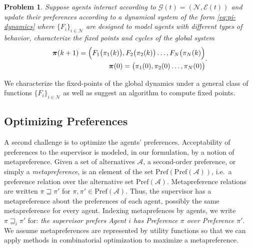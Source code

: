 \documentclass[conference]{ieeeconf}
\newcommand{\N}{\mathcal{N}}
\newcommand{\A}{\mathcal{A}}
\newcommand{\Pref}{\mathrm{Pref}}
\newcommand{\metaprefers}{\sqsupseteq}
\newcommand{\graph}{\mathcal{G}}
\newcommand{\edges}{\mathcal{E}}
\newtheorem{problem}{Problem}
\begin{document}
\begin{problem} \label{prob:dynamics}
    Suppose agents interact according to $\graph(t) = (\N,\edges(t))$ and update their preferences according to a dynamical system of the form \eqref{eq:pi-dynamics} where $\{F_i\}_{i \in \N}$ are designed to model agents with different types of behavior, characterize the fixed points and cycles of the global system
    \leavevmode
    \begin{align}
    \begin{aligned}
        \boldsymbol{\pi}(k+1) = \Bigl( F_1\bigl(\pi_1(k) \bigr), F_2\bigl(\pi_2(k) \bigr) \dots, F_N\bigl(\pi_N(k) \Bigr) \\
        \boldsymbol{\pi}(0) = \bigl( \pi_{1}(0), \pi_{2}(0) \dots, \pi_{N}(0) \bigr)
    \end{aligned}. \label{eq:pi-global}
    \end{align}
\end{problem}

We characterize the fixed-points of the global dynamics under a general class of functions $\{ F_i \}_{i \in \N}$ as well as suggest an algorithm to compute fixed points.

\subsection{Optimizing Preferences}

A second challenge is to optimize the agents' preferences.
Acceptability of preferences to the supervisor is modeled, in our formulation, by a notion of metapreference. Given a set of alternatives $\A$, a second-order preference, or simply a \emph{metapreference}, is an element of the set $\Pref(\Pref(\A))$, i.e.~a preference relation over the alternative set $\Pref(\A)$. Metapreference relations are written $\pi \metaprefers \pi'$ for $\pi, \pi' \in \Pref(\A)$. Thus, the supervisor has a metapreference about the preferences of each agent, possibly the same metapreference for every agent. Indexing metaprefences by agents, we write $\pi \metaprefers_i \pi'$ for: \emph{the supervisor prefers Agent $i$ has Preference $\pi$ over Preference $\pi'$}. We assume metapreferences are represented by utility functions so that we can apply methods in combinatorial optimization to maximize a metapreference.
\end{document}
